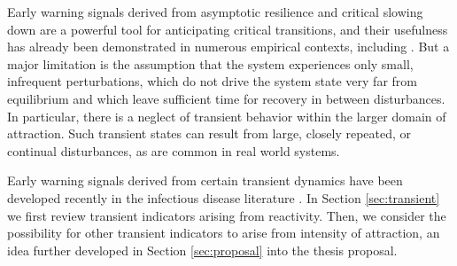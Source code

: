 Early warning signals derived from asymptotic resilience and critical slowing down are a powerful tool for anticipating critical transitions, and their usefulness has already been demonstrated in numerous empirical contexts, including . But a major limitation is the assumption that the system experiences only small, infrequent perturbations, which do not drive the system state very far from equilibrium and which leave sufficient time for recovery in between disturbances. In particular, there is a neglect of transient behavior within the larger domain of attraction. Such transient states can result from large, closely repeated, or continual disturbances, as are common in real world systems.  

Early warning signals derived from certain transient dynamics have been developed recently in the infectious disease literature \cite{oreganTransientIndicatorsTipping2020}. In Section \ref{sec:transient} we first review transient indicators arising from reactivity. Then, we consider the possibility for other transient indicators to arise from intensity of attraction, an idea further developed in Section \ref{sec:proposal} into the thesis proposal. 























